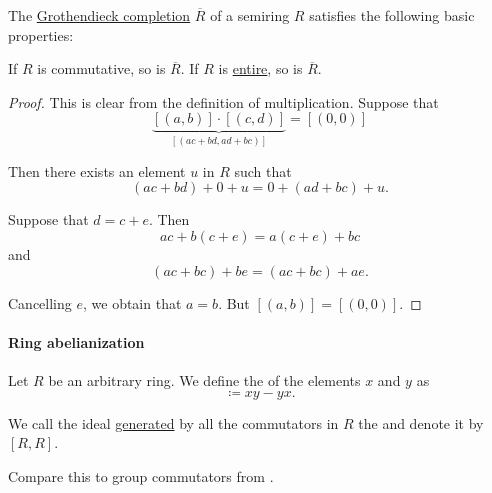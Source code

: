 \begin{proposition}\label{thm:def:grothendieck_semiring_completion}
  The \hyperref[thm:grothendieck_semiring_completion]{Grothendieck completion} \( \overline{R} \) of a semiring \( R \) satisfies the following basic properties:
  \begin{thmenum}
     If \( R \) is commutative, so is \( \overline{R} \).
     If \( R \) is \hyperref[def:entire_semiring]{entire}, so is \( \overline{R} \).
  \end{thmenum}
\end{proposition}
\begin{proof}
   This is clear from the definition of multiplication.
   Suppose that
  \begin{equation*}
    \underbrace{[(a, b)] \cdot [(c, d)]}_{[(ac + bd, ad + bc)]} = [(0, 0)]
  \end{equation*}

  Then there exists an element \( u \) in \( R \) such that
  \begin{equation*}
    (ac + bd) + 0 + u = 0 + (ad + bc) + u.
  \end{equation*}

  Suppose that \( d = c + e \). Then
  \begin{equation*}
    ac + b(c + e) = a(c + e) + bc
  \end{equation*}
  and
  \begin{equation*}
    (ac + bc) + be = (ac + bc) + ae.
  \end{equation*}

  Cancelling \( e \), we obtain that \( a = b \). But \( [(a, b)] = [(0, 0)] \).
\end{proof}

\paragraph{Ring abelianization}

\begin{definition}\label{def:ring_commutator}\mimprovised
  Let \( R \) be an arbitrary ring. We define the  of the elements \( x \) and \( y \) as
  \begin{equation*}
    [x, y] \coloneqq xy - yx.
  \end{equation*}

  We call the ideal \hyperref[def:semiring_ideal/generated]{generated} by all the commutators in \( R \) the  and denote it by \( [R, R] \).
\end{definition}
\begin{comments}
  \item Compare this to group commutators from .
\end{comments}


